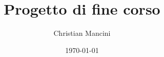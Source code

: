 \documentclass{article}
\title{Progetto di fine corso}
\author{Christian Mancini}
\date{\today}
\theoremstyle{remark}
\begin{document}
\maketitle








\clearpage
\listoffigures
\listoftables
\lstlistoflistings
\end{document}
